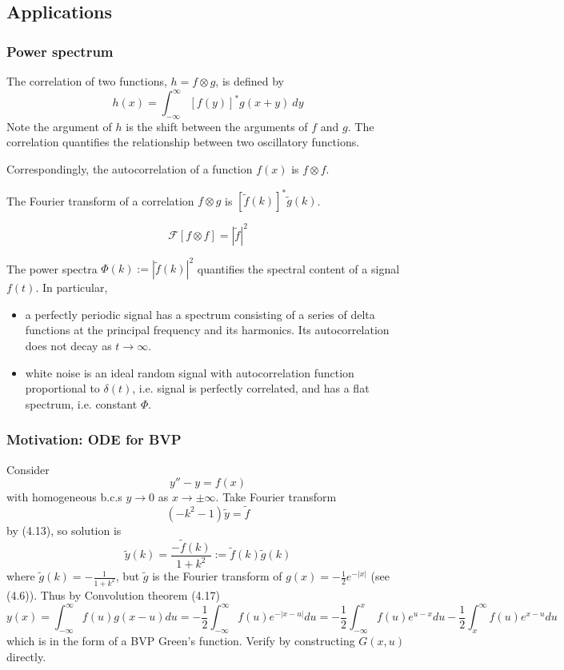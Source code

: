 \documentclass[a4paper]{article}
\begin{document}
\subsection{Applications}
\subsubsection*{Power spectrum}
\begin{defi}[Correlation]
The correlation of two functions, $h=f\otimes g$, is defined by
$$h(x)=\int_{-\infty}^\infty [f(y)]^*g(x+y)~dy$$
Note the argument of $h$ is the shift between the arguments of $f$ and $g$. The correlation quantifies the relationship between two oscillatory functions.
\end{defi}
\begin{defi}[Autocorrelation]
Correspondingly, the autocorrelation of a function $f(x)$ is $f\otimes f$.
\end{defi}
\begin{prop}
The Fourier transform of a correlation $f\otimes g$ is $[\tilde{f}(k)]^*\tilde{g}(k)$.
\end{prop}
\begin{cor}
$$\mathcal{F}[f\otimes f]=|\tilde{f}|^2$$
\end{cor}
\begin{remarks}
The power spectra $\Phi(k):=|\tilde{f}(k)|^2$ quantifies the spectral content of a signal $f(t)$. In particular,
\begin{itemize}
    \item a perfectly periodic signal has a spectrum consisting of a series of delta functions at the principal frequency and its harmonics. Its autocorrelation does not decay as $t\rightarrow\infty$.
    \item white noise is an ideal random signal with autocorrelation function proportional to $\delta(t)$, i.e. signal is perfectly correlated, and has a flat spectrum, i.e. constant $\Phi$.
\end{itemize}
\end{remarks}
\subsubsection*{Motivation: ODE for BVP}
Consider $$y''-y=f(x)$$ with homogeneous b.c.s $y\rightarrow 0$ as $x\rightarrow\pm\infty$. Take Fourier transform $$(-k^2-1)\tilde{y}=\tilde{f}$$ by (4.13), so solution is $$\tilde{y}(k)=\frac{-\tilde{f}(k)}{1+k^2}:=\tilde{f}(k)\tilde{g}(k)$$
where $\tilde{g}(k)=-\frac{1}{1+k^2}$, but $\tilde{g}$ is the Fourier transform of $g(x)=-\frac{1}{2}e^{-|x|}$ (see (4.6)). Thus by Convolution theorem (4.17)
$$y(x)=\int_{-\infty}^\infty f(u)g(x-u)du=-\frac{1}{2}\int_{-\infty}^\infty f(u)e^{-|x-u|}du=-\frac{1}{2}\int_{-\infty}^xf(u)e^{u-x}du-\frac{1}{2}\int_x^\infty f(u)e^{x-u}du$$
which is in the form of a BVP Green's function. Verify by constructing $G(x,u)$ directly.
\end{document}
